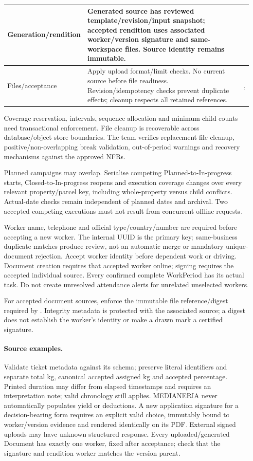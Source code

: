 {\begin{longtable}{L{0.24}L{0.59}L{0.17}}
\midrule
Generation/rendition & Generated source has reviewed template/revision/input snapshot; accepted rendition uses associated worker/version signature and same-workspace files. Source identity remains immutable. &  \\
\midrule
Files/acceptance & Apply upload format/limit checks. No current source before file readiness. Revision/idempotency checks prevent duplicate effects; cleanup respects all retained references. & ,  \\
\end{longtable}}

Coverage reservation, intervals, sequence allocation and minimum-child counts need
transactional enforcement. File cleanup is recoverable across database/object-store
boundaries. The team verifies replacement file cleanup, positive/non-overlapping break validation, out-of-period warnings and recovery mechanisms against the approved NFRs.


Planned campaigns may overlap. Serialise competing Planned-to-In-progress starts,
Closed-to-In-progress reopens and execution coverage changes over every relevant
property/parcel key, including whole-property versus child conflicts. Actual-date
checks remain independent of planned dates and archival. Two accepted competing
executions must not result from concurrent offline requests.

Worker name, telephone and official type/country/number are required before accepting
a new worker. The internal UUID is the primary key; same-business duplicate matches
produce review, not an automatic merge or mandatory unique-document rejection.
Accept worker identity before dependent work or driving. Document creation
requires that accepted worker online; signing requires the accepted individual source. Every confirmed complete WorkPeriod has its actual task.
Do not create unresolved attendance alerts for unrelated unselected workers.

For accepted document sources, enforce the immutable file reference/digest required
by . Integrity metadata is protected with the associated source; a digest does
not establish the worker's identity or make a drawn mark a certified signature.

\paragraph{Source examples.}
Validate ticket metadata against its schema; preserve literal identifiers and
separate total kg, canonical accepted assigned kg and accepted percentage. Printed duration may differ from
elapsed timestamps and requires an interpretation note; valid chronology still
applies. MEDIANERIA never automatically populates yield or deductions. A new
application signature for a decision-bearing form requires an explicit valid choice,
immutably bound to worker/version evidence and rendered identically on its PDF.
External signed uploads may have unknown structured response. Every uploaded/generated Document has exactly one worker, fixed after acceptance;
check that the signature and rendition worker matches the version parent.

